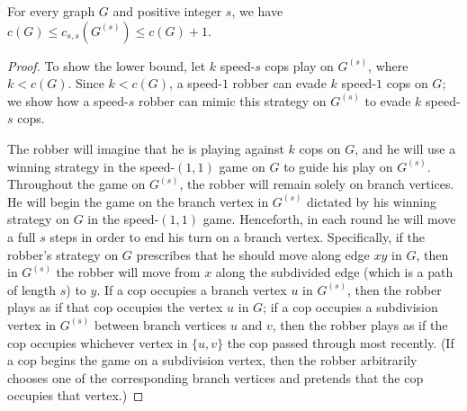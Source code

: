 \documentclass[10pt,a4paper]{amsart}
\newcommand{\speeds}{c_{s,s}}
\begin{document}
\begin{theorem}\label{thm:subdivision}
    For every graph $G$ and positive integer $s$, we have $c(G)\le \speeds(G^{(s)})\le c(G)+1$.
\end{theorem}

\begin{proof}
    To show the lower bound, let $k$ speed-$s$ cops play on $G^{(s)}$, where $k<c(G)$.   Since $k < c(G)$, a speed-$1$ robber can evade $k$ speed-$1$ cops on $G$; we show how a speed-$s$ robber can mimic this strategy on $G^{(s)}$ to evade $k$ speed-$s$ cops.
    
    The robber will imagine that he is playing against $k$ cops on $G$, and he will use a winning strategy in the speed-$(1,1)$ game on $G$ to guide his play on $G^{(s)}$.  Throughout the game on $G^{(s)}$, the robber will remain solely on branch vertices.  He will begin the game on the branch vertex in $G^{(s)}$ dictated by his winning strategy on $G$ in the speed-$(1,1)$ game.  Henceforth, in each round he will move a full $s$ steps in order to end his turn on a branch vertex.  Specifically, if the robber's strategy on $G$ prescribes that he should move along edge $xy$ in $G$, then in $G^{(s)}$ the robber will move from $x$ along the subdivided edge (which is a path of length $s$) to $y$.  If a cop occupies a branch vertex $u$ in $G^{(s)}$, then the robber plays as if that cop occupies the vertex $u$ in $G$; if a cop occupies a subdivision vertex in $G^{(s)}$ between branch vertices $u$ and $v$, then the robber plays as if the cop occupies whichever vertex in $\{u,v\}$ the cop passed through most recently.  (If a cop begins the game on a subdivision vertex, then the robber arbitrarily chooses one of the corresponding branch vertices and pretends that the cop occupies that vertex.)
    

\end{proof}
\end{document}
